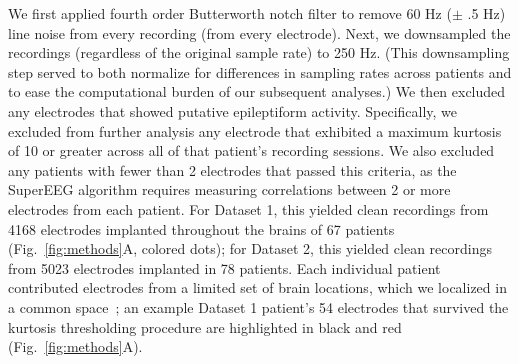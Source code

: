 \documentclass[11pt]{article}
\begin{document}
We first applied fourth order Butterworth notch filter to remove 60 Hz ($\pm$ .5
Hz) line noise from every recording (from every electrode). Next, we downsampled
the recordings (regardless of the original sample rate) to 250 Hz.  (This
downsampling step served to both normalize for differences in sampling rates
across patients and to ease the computational burden of our subsequent
analyses.)  We then excluded any electrodes that showed putative epileptiform
activity. Specifically, we excluded from further analysis any electrode that
exhibited a maximum kurtosis of 10 or greater across all of that patient's
recording sessions.  We also excluded any patients with fewer than 2 electrodes
that passed this criteria, as the SuperEEG algorithm requires measuring
correlations between 2 or more electrodes from each patient.  For Dataset 1,
this yielded clean recordings from 4168 electrodes implanted throughout the
brains of 67 patients (Fig.~\ref{fig:methods}A, colored dots); for Dataset 2,
this yielded clean recordings from 5023 electrodes implanted in 78 patients.
Each individual patient contributed electrodes from a limited set of brain
locations, which we localized in a common space~\citep[MNI152;][]{GrabEtal06};
an example Dataset 1 patient's 54 electrodes that survived the kurtosis
thresholding procedure are highlighted in black and red
(Fig.~\ref{fig:methods}A).
\end{document}
